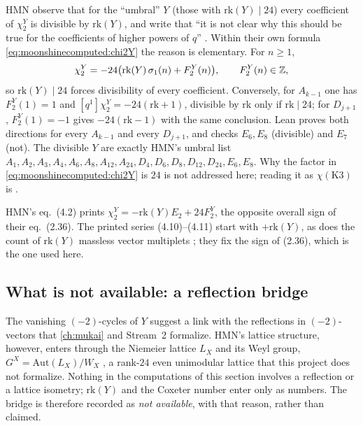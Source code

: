 HMN observe that for the ``umbral'' $Y$ (those with $\mathrm{rk}(Y)\mid24$) every coefficient
of $\chi_2^Y$ is divisible by $\mathrm{rk}(Y)$, and write that ``it is not clear why this
should be true for the coefficients of higher powers of $q$'' .
Within their own formula \eqref{eq:moonshinecomputed:chi2Y} the reason is elementary. For
$n\ge1$,
\begin{equation}
  [q^n]\chi_2^Y=-24\bigl(\mathrm{rk}(Y)\,\sigma_1(n)+F_2^Y(n)\bigr),\qquad F_2^Y(n)\in\Z,
\end{equation}
so $\mathrm{rk}(Y)\mid24$ forces divisibility of every coefficient. Conversely, for
$A_{k-1}$ one has $F_2^Y(1)=1$ and $[q^1]\chi_2^Y=-24(\mathrm{rk}+1)$, divisible by
$\mathrm{rk}$ only if $\mathrm{rk}\mid24$; for $D_{j+1}$, $F_2^Y(1)=-1$ gives
$-24(\mathrm{rk}-1)$ with the same conclusion. Lean proves both directions for every
$A_{k-1}$ and every $D_{j+1}$, and checks $E_6,E_8$ (divisible) and $E_7$ (not). The
divisible $Y$ are exactly HMN's umbral list $A_1,A_2,A_3,A_4,A_6,A_8,A_{12},A_{24},D_4,D_6,
D_8,D_{12},D_{24},E_6,E_8$. Why the factor in \eqref{eq:moonshinecomputed:chi2Y} is $24$ is
not addressed here; reading it as $\chi(\mathrm{K3})$ is \TC.

\begin{pitfallbox}
HMN's eq.~(4.2)  prints $\chi_2^Y=-\mathrm{rk}(Y)E_2+24F_2^Y$,
the opposite overall sign of their eq.~(2.36). The printed series (4.10)--(4.11) start with
$+\mathrm{rk}(Y)$, as does the count of $\mathrm{rk}(Y)$ massless vector multiplets
; they fix the sign of (2.36), which is the one used here.
\end{pitfallbox}

\subsection{What is not available: a reflection bridge}

The vanishing $(-2)$-cycles of $Y$ suggest a link with the reflections in $(-2)$-vectors
that \cref{ch:mukai} and Stream~2 formalize. HMN's lattice structure, however, enters
through the Niemeier lattice $L_X$ and its Weyl group,
$G^X=\mathrm{Aut}(L_X)/W_X$ , a rank-$24$ even unimodular
lattice that this project does not formalize. Nothing in the computations of this section
involves a reflection or a lattice isometry; $\mathrm{rk}(Y)$ and the Coxeter number enter
only as numbers. The bridge is therefore recorded as \emph{not available}, with that
reason, rather than claimed.

